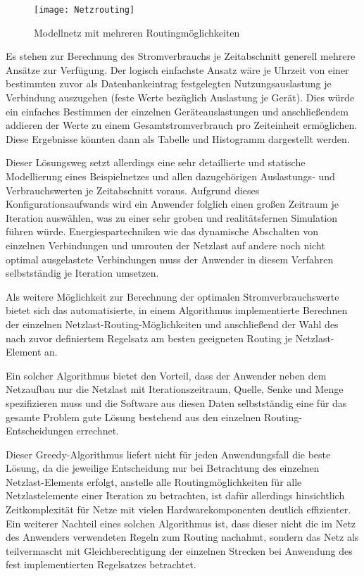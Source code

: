 \begin{figure}[!ht]
	\centering
	\texttt{[image: Netzrouting]}
	\caption{Modellnetz mit mehreren Routingmöglichkeiten}
	\label{fig:Netzrouting}
\end{figure}


Es stehen zur Berechnung des Stromverbrauchs je Zeitabschnitt generell mehrere Ansätze zur Verfügung. Der logisch einfachste Ansatz wäre je Uhrzeit von einer bestimmten zuvor als Datenbankeintrag festgelegten Nutzungsauslastung je Verbindung auszugehen (feste Werte bezüglich Auslastung je Gerät). Dies würde ein einfaches Bestimmen der einzelnen Geräteauslastungen und anschließendem addieren der Werte zu einem Gesamtstromverbrauch pro Zeiteinheit ermöglichen. Diese Ergebnisse könnten dann als Tabelle und Histogramm dargestellt werden.


Dieser Lösungsweg setzt allerdings eine sehr detaillierte und statische Modellierung eines Beispielnetzes und allen dazugehörigen Auslastungs- und Verbrauchswerten je Zeitabschnitt voraus. Aufgrund dieses Konfigurationsaufwands wird ein Anwender folglich einen großen Zeitraum je Iteration auswählen, was zu einer sehr groben und realitätsfernen Simulation führen würde. Energiespartechniken wie das dynamische Abschalten von einzelnen Verbindungen und umrouten der Netzlast auf andere noch nicht optimal ausgelastete Verbindungen muss der Anwender in diesem Verfahren selbstständig je Iteration umsetzen.


Als weitere Möglichkeit zur Berechnung der optimalen Stromverbrauchswerte bietet sich das automatisierte, in einem Algorithmus implementierte Berechnen der einzelnen Netzlast-Routing-Möglichkeiten und anschließend der Wahl des nach zuvor definiertem Regelsatz am besten geeigneten Routing je Netzlast-Element an.

Ein solcher Algorithmus bietet den Vorteil, dass der Anwender neben dem Netzaufbau nur die Netzlast mit Iterationszeitraum, Quelle, Senke und Menge spezifizieren muss und die Software aus diesen Daten selbstständig eine für das gesamte Problem  gute Lösung bestehend aus den einzelnen Routing-Entscheidungen errechnet.


Dieser Greedy-Algorithmus liefert nicht für jeden Anwendungsfall die beste Lösung, da die jeweilige Entscheidung nur bei Betrachtung des einzelnen Netzlast-Elements erfolgt, anstelle alle Routingmöglichkeiten für alle Netzlastelemente einer Iteration zu betrachten, ist dafür allerdings hinsichtlich Zeitkomplexität für Netze mit vielen Hardwarekomponenten deutlich effizienter.
Ein weiterer Nachteil eines solchen Algorithmus ist, dass dieser nicht die im Netz des Anwenders verwendeten Regeln zum Routing nachahmt, sondern das Netz als teilvermascht mit Gleichberechtigung der einzelnen Strecken bei Anwendung des fest implementierten Regelsatzes betrachtet.


